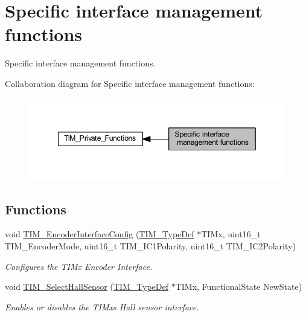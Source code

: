 \hypertarget{group___t_i_m___group8}{}\section{Specific interface management functions}
\label{group___t_i_m___group8}


Specific interface management functions.  


Collaboration diagram for Specific interface management functions\+:
\nopagebreak
\begin{figure}[H]
\begin{center}
\leavevmode
\includegraphics[width=349pt]{group___t_i_m___group8}
\end{center}
\end{figure}
\subsection*{Functions}
\begin{DoxyCompactItemize}
\item 
void \hyperlink{group___t_i_m___group8_ga0fc7e76c47a3bd1ba1ebc71427832b51}{T\+I\+M\+\_\+\+Encoder\+Interface\+Config} (\hyperlink{struct_t_i_m___type_def}{T\+I\+M\+\_\+\+Type\+Def} $\ast$T\+I\+Mx, uint16\+\_\+t T\+I\+M\+\_\+\+Encoder\+Mode, uint16\+\_\+t T\+I\+M\+\_\+\+I\+C1\+Polarity, uint16\+\_\+t T\+I\+M\+\_\+\+I\+C2\+Polarity)
\begin{DoxyCompactList}\small\item\em Configures the T\+I\+Mx Encoder Interface. \end{DoxyCompactList}\item 
void \hyperlink{group___t_i_m___group8_ga42c2d1025a3937c9d9f38631af86ffa4}{T\+I\+M\+\_\+\+Select\+Hall\+Sensor} (\hyperlink{struct_t_i_m___type_def}{T\+I\+M\+\_\+\+Type\+Def} $\ast$T\+I\+Mx, Functional\+State New\+State)
\begin{DoxyCompactList}\small\item\em Enables or disables the T\+I\+Mx\textquotesingle{}s Hall sensor interface. \end{DoxyCompactList}\end{DoxyCompactItemize}



